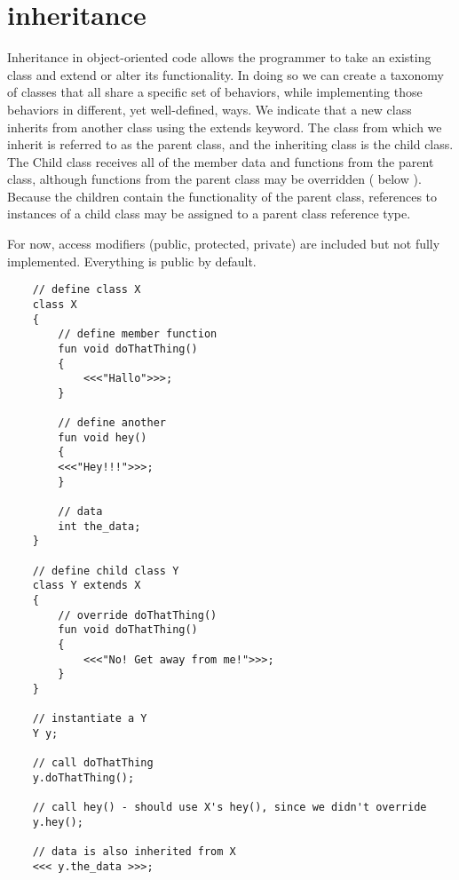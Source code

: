 \section{inheritance}

Inheritance in object-oriented code allows the programmer to take an existing class and extend or alter its functionality. In doing so we can create a taxonomy of classes that all share a specific set of behaviors, while implementing those behaviors in different, yet well-defined, ways. We indicate that a new class inherits from another class using the extends keyword. The class from which we inherit is referred to as the parent class, and the inheriting class is the child class. The Child class receives all of the member data and functions from the parent class, although functions from the parent class may be overridden ( below ). Because the children contain the functionality of the parent class, references to instances of a child class may be assigned to a parent class reference type.

For now, access modifiers (public, protected, private) are included but not fully implemented. Everything is public by default.

\begin{verbatim}
    // define class X
    class X
    {
        // define member function
        fun void doThatThing()
        {
            <<<"Hallo">>>;
        }

        // define another
        fun void hey()
        {
        <<<"Hey!!!">>>;
        }

        // data
        int the_data;
    }

    // define child class Y
    class Y extends X
    {
        // override doThatThing()
        fun void doThatThing()
        {
            <<<"No! Get away from me!">>>;
        }
    }

    // instantiate a Y
    Y y;

    // call doThatThing
    y.doThatThing();

    // call hey() - should use X's hey(), since we didn't override
    y.hey();

    // data is also inherited from X
    <<< y.the_data >>>;
\end{verbatim}

